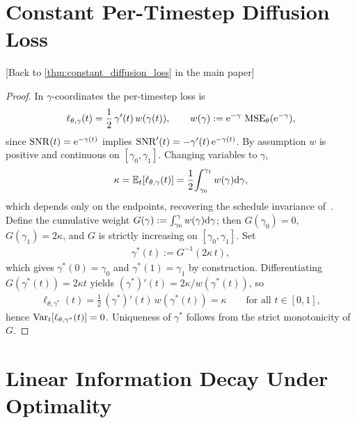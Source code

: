 \documentclass{article}
\begin{document}
\clearpage


\section{Constant Per-Timestep Diffusion Loss}\label{supp:sec:constant-diffusion-proof}

[Back to \cref{thm:constant_diffusion_loss} in the main paper]

\vspace{0.5em}
\thmconstantdiffusion*

\begin{proof}
%
In $\gamma$-coordinates the per-timestep loss is
\begin{align}
    \ell_{\theta,\gamma}(t) = \frac{1}{2}\,\gamma'(t)\,w(\gamma(t)),
    \qquad w(\gamma) := {\mathrm{e}}^{-\gamma}\,\operatorname{MSE}_\theta({\mathrm{e}}^{-\gamma}),
\end{align}
since ${\mathrm{SNR}}(t)={\mathrm{e}}^{-\gamma(t)}$ implies ${\mathrm{SNR}}'(t) = -\gamma'(t)\,{\mathrm{e}}^{-\gamma(t)}$. By assumption $w$ is positive and continuous on $[\gamma_0,\gamma_1]$. Changing variables to $\gamma$,
\begin{align}
    \kappa
    = \mathbb{E}_t[\ell_{\theta,\gamma}(t)]
    = \frac{1}{2}\!\int_{\gamma_0}^{\gamma_1} w(\gamma){\mathrm{d}}\gamma,
\end{align}
which depends only on the endpoints, recovering the schedule invariance of~\citet{kingma2021variational}. Define the cumulative weight $G(\gamma) := \int_{\gamma_0}^\gamma w(\gamma){\mathrm{d}}\gamma$; then $G(\gamma_0)=0$, $G(\gamma_1)=2\kappa$, and $G$ is strictly increasing on $[\gamma_0,\gamma_1]$. Set
\begin{align}\label{eq:optimal-gamma}
    \gamma^*(t) := G^{-1}(2\kappa\,t),
\end{align}
which gives $\gamma^*(0)=\gamma_0$ and $\gamma^*(1)=\gamma_1$ by construction. Differentiating $G(\gamma^*(t))=2\kappa t$ yields $(\gamma^*)'(t) = 2\kappa / w(\gamma^*(t))$, so
\begin{align}\label{eq:optimal-per-timestep-diffusion}
    \ell_{\theta,\gamma^*}(t)
    = \frac{1}{2}\,(\gamma^*)'(t)\,w(\gamma^*(t))
    = \kappa
    \qquad\text{for all }t\in[0,1],
\end{align}
hence $\operatorname{Var}_t[\ell_{\theta,\gamma^*}(t)]=0$. Uniqueness of $\gamma^*$ follows from the strict monotonicity of $G$.
\end{proof}

\clearpage

\section{Linear Information Decay Under Optimality}\label{supp:sec:linear-info-decay}
\end{document}
